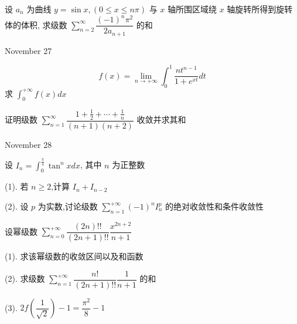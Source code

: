 \begin{solution}
	
\end{solution}


\begin{example}[][Exam: 37.4.10]
	设 $a_{n}$ 为曲线 $y=\sin x,(0\leq x\leq n\pi)$ 与 $x$ 轴所围区域绕 $x$ 轴旋转所得到旋转体的体积,
求级数 $\sum\limits_{n=2}^{\infty}\dfrac{(-1)^{n}\pi^{2}}{2a_{n+1}}$ 的和
\end{example}

\begin{solution}
	
\end{solution}


\textcolor{purplea}{November 27}

\begin{example}[][Exam: 37.4.11]
	$$f(x)=\lim\limits_{n\to+\infty}\int_{0}^{1}\dfrac{nt^{n-1}}{1+e^{xt}}dt$$
求 $\int_{0}^{+\infty}f(x)dx$
\end{example}

\begin{solution}
	
\end{solution}

\begin{example}[][Exam: 37.4.12]
	证明级数 $\sum\limits_{n=1}^{\infty}\dfrac{1+\frac{1}{2}+\cdots+\frac{1}{n}}{(n+1)(n+2)}$ 收敛并求其和
\end{example}

\begin{solution}
	
\end{solution}


\textcolor{purplea}{November 28}

\begin{example}[][Exam: 37.4.13]
	设 $I_{n}=\int_{0}^{\frac{\pi}{4}}\tan^{n}xdx$, 其中 $n$ 为正整数

(1). 若 $n\geq 2$,计算 $I_{n}+I_{n-2}$

(2). 设 $p$ 为实数,讨论级数 $\sum\limits_{n=1}^{+\infty}(-1)^{n}I_{n}^{p}$ 的绝对收敛性和条件收敛性
\end{example}

\begin{solution}
	
\end{solution}

\begin{example}[][Exam: 37.4.14]
	设幂级数 $\sum\limits_{n=0}^{+\infty}\dfrac{(2n)!!}{(2n+1)!!}\dfrac{x^{2n+2}}{n+1}$

(1). 求该幂级数的收敛区间以及和函数

(2). 求级数 $\sum\limits_{n=1}^{+\infty}\dfrac{n!}{(2n+1)!!}\dfrac{1}{n+1}$ 的和

(3). $2f(\dfrac{1}{\sqrt{2}})-1=\dfrac{\pi^{2}}{8}-1$
\end{example}

